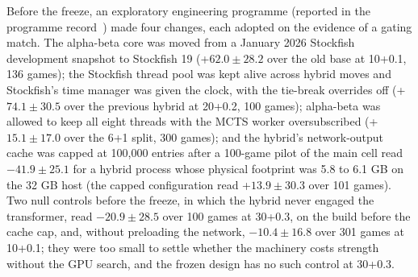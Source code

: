 \documentclass{article}
\newif\ifanon
\newcommand{\depositcite}{\ifanon\cite{anonarchive}\else\cite{zenodo}\fi}
\newcommand{\elo}[2]{$#1 \pm #2$}
\begin{document}
Before the freeze, an exploratory engineering programme (reported in the programme record~\depositcite{}) made four changes, each adopted on the evidence of a gating match. The alpha-beta core was moved from a January 2026 Stockfish development snapshot to Stockfish 19 (+\elo{62.0}{28.2} over the old base at 10+0.1, 136 games); %
the Stockfish thread pool was kept alive across hybrid moves and Stockfish's time manager was given the clock, with the tie-break overrides off (+\elo{74.1}{30.5} over the previous hybrid at 20+0.2, 100 games); %
alpha-beta was allowed to keep all eight threads with the MCTS worker oversubscribed (+\elo{15.1}{17.0} over the 6+1 split, 300 games); %
and the hybrid's network-output cache was capped at 100{,}000 entries after a 100-game pilot of the main cell read \elo{-41.9}{25.1} for a hybrid process whose physical footprint was 5.8 to 6.1 GB on the 32 GB host (the capped configuration read +\elo{13.9}{30.3} over 101 games). Two null controls before the freeze, in which the hybrid never engaged the transformer, read \elo{-20.9}{28.5} over 100 games at 30+0.3, on the build before the cache cap, and, without preloading the network, \elo{-10.4}{16.8} over 301 games at 10+0.1; they were too small to settle whether the machinery costs strength without the GPU search, and the frozen design has no such control at 30+0.3. %
\end{document}

